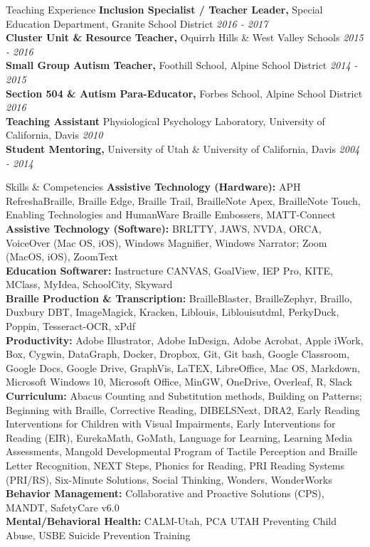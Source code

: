 \documentclass{resume} %
\begin{document}
\begin{rSection}{Teaching Experience}
	{\bf Inclusion Specialist / Teacher Leader,} Special Education Department, Granite School District \hfill {\em 2016 - 2017}
	\\{\bf Cluster Unit \& Resource Teacher,} Oquirrh Hills \& West Valley Schools \hfill {\em	2015 - 2016}
	\\{\bf Small Group Autism Teacher,} Foothill School, Alpine School District \hfill {\em 2014 - 2015}
	\\{\bf Section 504 \& Autism Para-Educator,} Forbes School, Alpine School District \hfill {\em 2016}
	\\{\bf Teaching Assistant} Physiological Psychology Laboratory, University of California, Davis \hfill {\em 2010}
	\\{\bf Student Mentoring,} University of Utah \& University of California, Davis \hfill {\em 2004 - 2014}
\end{rSection}
\begin{rSection}{Skills \& Competencies}
	\textbf{Assistive Technology (Hardware):} APH RefreshaBraille, Braille Edge, Braille Trail, BrailleNote Apex, BrailleNote Touch, Enabling Technologies and HumanWare Braille Embossers, MATT-Connect \\[.5em]
	\textbf{Assistive Technology (Software):} BRLTTY, JAWS, NVDA, ORCA, VoiceOver (Mac OS, iOS), Windows Magnifier, Windows Narrator; Zoom (MacOS, iOS), ZoomText \\[.5em]
	\textbf{Education Softwarer:}  Instructure CANVAS, GoalView, IEP Pro, KITE, MClass, MyIdea, SchoolCity, Skyward \\[.5em]
	\textbf{Braille Production \& Transcription:} BrailleBlaster, BrailleZephyr, Braillo, Duxbury DBT, ImageMagick, Kracken, Liblouis, Liblouisutdml, PerkyDuck, Poppin, Tesseract-OCR,  xPdf\\[.5em]
	\textbf{Productivity:} Adobe Illustrator, Adobe InDesign, Adobe Acrobat, Apple iWork, Box, Cygwin, DataGraph, Docker, Dropbox, Git, Git bash, Google Classroom, Google Docs, Google Drive, GraphVis, LaTEX, LibreOffice, 	Mac OS, Markdown, Microsoft Windows 10, Microsoft Office, MinGW, OneDrive, Overleaf, R, Slack\\[.5em]
	\textbf{Curriculum:} Abacus Counting and Substitution methods, Building on Patterns; Beginning with Braille, Corrective Reading, DIBELSNext, DRA2, Early Reading Interventions for Children with Visual Impairments, Early Interventions for Reading (EIR), EurekaMath, GoMath, Language for Learning, Learning Media Assessments, Mangold Developmental Program of Tactile Perception and Braille Letter Recognition, NEXT Steps, Phonics for Reading, PRI Reading Systems (PRI/RS), Six-Minute Solutions, Social Thinking, Wonders, WonderWorks   \\[0.5em]
	\textbf{Behavior Management:} Collaborative and Proactive Solutions (CPS), MANDT, SafetyCare v6.0 \\[0.5em]
	\textbf{Mental/Behavioral Health:} CALM-Utah, PCA UTAH Preventing Child Abuse, USBE Suicide Prevention Training
\end{rSection}
\end{document}
